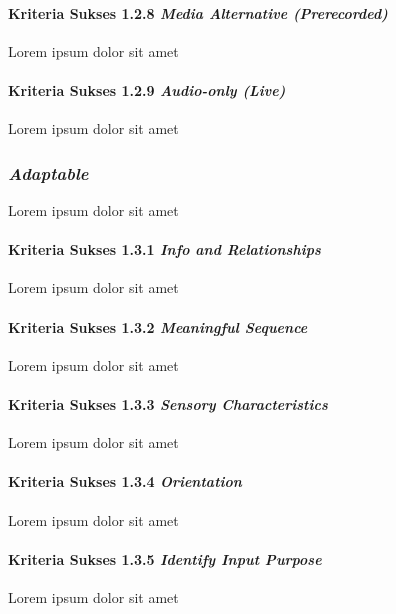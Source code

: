 \paragraph{Kriteria Sukses 1.2.8 \textit{Media Alternative (Prerecorded)}}
\label{sec:kriteria_sukses_1.2.8}
Lorem ipsum dolor sit amet

\paragraph{Kriteria Sukses 1.2.9 \textit{Audio-only (Live)}}
\label{sec:kriteria_sukses_1.2.9}
Lorem ipsum dolor sit amet

\subsubsection{\textit{Adaptable}}
\label{sec:adaptable}
Lorem ipsum dolor sit amet

\paragraph{Kriteria Sukses 1.3.1 \textit{Info and Relationships}}
\label{sec:kriteria_sukses_1.3.1}
Lorem ipsum dolor sit amet

\paragraph{Kriteria Sukses 1.3.2 \textit{Meaningful Sequence}}
\label{sec:kriteria_sukses_1.3.2}
Lorem ipsum dolor sit amet

\paragraph{Kriteria Sukses 1.3.3 \textit{Sensory Characteristics}}
\label{sec:kriteria_sukses_1.3.3}
Lorem ipsum dolor sit amet

\paragraph{Kriteria Sukses 1.3.4 \textit{Orientation}}
\label{sec:kriteria_sukses_1.3.4}
Lorem ipsum dolor sit amet

\paragraph{Kriteria Sukses 1.3.5 \textit{Identify Input Purpose}}
\label{sec:kriteria_sukses_1.3.5}
Lorem ipsum dolor sit amet

